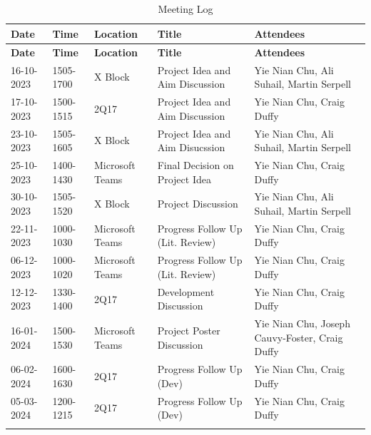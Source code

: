 \newpage
\begin{landscape}
\section{}
\label{app:appendix-d}
\begin{longtable}{ |m{2.5cm}|m{2.5cm}|m{2cm}|m{6.5cm}|m{8cm}| }
    \hline
    \rowcolor{lightgray}
    \textbf{Date} & \textbf{Time} & \textbf{Location} & \textbf{Title} & \textbf{Attendees} \\
    \hline
    \endfirsthead

    \hline
    \rowcolor{lightgray}
    \textbf{Date} & \textbf{Time} & \textbf{Location} & \textbf{Title} & \textbf{Attendees} \\
    \hline
    \endhead
    16-10-2023 & 1505-1700 & X Block & Project Idea and Aim Discussion & Yie Nian Chu, Ali Suhail, Martin Serpell \\
    \hline
    17-10-2023 & 1500-1515 & 2Q17 & Project Idea and Aim Discussion & Yie Nian Chu, Craig Duffy \\
    \hline
    23-10-2023 & 1505-1605 & X Block & Project Idea and Aim Disucssion & Yie Nian Chu, Ali Suhail, Martin Serpell \\
    \hline
    25-10-2023 & 1400-1430 & Microsoft Teams & Final Decision on Project Idea & Yie Nian Chu, Craig Duffy \\
    \hline
    30-10-2023 & 1505-1520 & X Block & Project Discussion & Yie Nian Chu, Ali Suhail, Martin Serpell \\
    \hline
    22-11-2023 & 1000-1030 & Microsoft Teams & Progress Follow Up (Lit. Review) & Yie Nian Chu, Craig Duffy \\
    \hline
    06-12-2023 & 1000-1020 & Microsoft Teams & Progress Follow Up (Lit. Review) & Yie Nian Chu, Craig Duffy \\
    \hline
    12-12-2023 & 1330-1400 & 2Q17 & Development Discussion & Yie Nian Chu, Craig Duffy \\
    \hline
    16-01-2024 & 1500-1530 & Microsoft Teams & Project Poster Discussion & Yie Nian Chu, Joseph Cauvy-Foster, Craig Duffy \\
    \hline
    06-02-2024 & 1600-1630 & 2Q17 & Progress Follow Up (Dev) & Yie Nian Chu, Craig Duffy \\
    \hline
    05-03-2024 & 1200-1215 & 2Q17 & Progress Follow Up (Dev) & Yie Nian Chu, Craig Duffy \\
    \hline
    \caption{Meeting Log}
\end{longtable}
\end{landscape}

